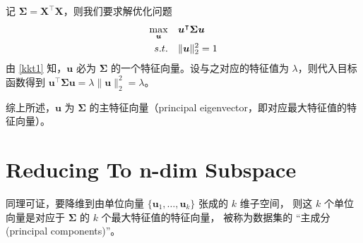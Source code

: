 		记 $ \bm{\Sigma} = \bm{X}^\intercal \bm{X} $，则我们要求解优化问题
		\begin{align}
			\max_{\bm{u}} \quad & \bm{u}^\intercal \bm{\Sigma} \bm{u} \\
			s.t. \quad & \| \bm{u} \|_2^2 = 1
		\end{align}
		由 \eqref{kkt1} 知，$ \bm{u} $ 必为 $ \bm{\Sigma} $ 的一个特征向量。设与之对应的特征值为 $ \lambda $，则代入目标函数得到 $ \bm{u}^\intercal \bm{\Sigma} \bm{u} = \lambda \| \bm{u} \|_2^2 = \lambda $。
		
		综上所述，$ \bm{u} $ 为 $ \bm{\Sigma} $ 的主特征向量（principal eigenvector，即对应最大特征值的特征向量）。
		
	\section{Reducing To n-dim Subspace}
		同理可证，要降维到由单位向量 $ \{ \bm{u}_1, \ldots, \bm{u}_k \} $ 张成的 $ k $ 维子空间，
		则这 $ k $ 个单位向量是对应于 $ \bm{\Sigma} $ 的 $ k $ 个最大特征值的特征向量，
		被称为数据集的 “主成分(principal components)”。